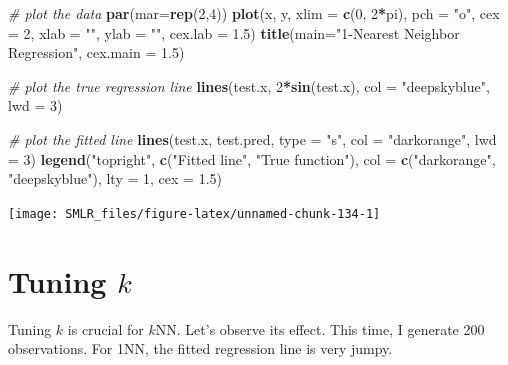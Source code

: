 \documentclass[
]{book}
\newenvironment{Shaded}{\begin{snugshade}}{\end{snugshade}}
\newcommand{\AttributeTok}[1]{\textcolor[rgb]{0.13,0.29,0.53}{#1}}
\newcommand{\CommentTok}[1]{\textcolor[rgb]{0.56,0.35,0.01}{\textit{#1}}}
\newcommand{\DecValTok}[1]{\textcolor[rgb]{0.00,0.00,0.81}{#1}}
\newcommand{\FloatTok}[1]{\textcolor[rgb]{0.00,0.00,0.81}{#1}}
\newcommand{\FunctionTok}[1]{\textcolor[rgb]{0.13,0.29,0.53}{\textbf{#1}}}
\newcommand{\NormalTok}[1]{#1}
\newcommand{\SpecialCharTok}[1]{\textcolor[rgb]{0.81,0.36,0.00}{\textbf{#1}}}
\newcommand{\StringTok}[1]{\textcolor[rgb]{0.31,0.60,0.02}{#1}}
\theoremstyle{definition}
\theoremstyle{definition}
\theoremstyle{definition}
\theoremstyle{definition}
\theoremstyle{remark}
\begin{document}
\begin{Shaded}
\begin{Highlighting}[]
    \CommentTok{\# plot the data}
    \FunctionTok{par}\NormalTok{(}\AttributeTok{mar=}\FunctionTok{rep}\NormalTok{(}\DecValTok{2}\NormalTok{,}\DecValTok{4}\NormalTok{))}
    \FunctionTok{plot}\NormalTok{(x, y, }\AttributeTok{xlim =} \FunctionTok{c}\NormalTok{(}\DecValTok{0}\NormalTok{, }\DecValTok{2}\SpecialCharTok{*}\NormalTok{pi), }\AttributeTok{pch =} \StringTok{"o"}\NormalTok{, }\AttributeTok{cex =} \DecValTok{2}\NormalTok{, }
         \AttributeTok{xlab =} \StringTok{""}\NormalTok{, }\AttributeTok{ylab =} \StringTok{""}\NormalTok{, }\AttributeTok{cex.lab =} \FloatTok{1.5}\NormalTok{)}
    \FunctionTok{title}\NormalTok{(}\AttributeTok{main=}\StringTok{"1{-}Nearest Neighbor Regression"}\NormalTok{, }\AttributeTok{cex.main =} \FloatTok{1.5}\NormalTok{)}
    
    \CommentTok{\# plot the true regression line}
    \FunctionTok{lines}\NormalTok{(test.x, }\DecValTok{2}\SpecialCharTok{*}\FunctionTok{sin}\NormalTok{(test.x), }\AttributeTok{col =} \StringTok{"deepskyblue"}\NormalTok{, }\AttributeTok{lwd =} \DecValTok{3}\NormalTok{)}
    
    \CommentTok{\# plot the fitted line}
    \FunctionTok{lines}\NormalTok{(test.x, test.pred, }\AttributeTok{type =} \StringTok{"s"}\NormalTok{, }\AttributeTok{col =} \StringTok{"darkorange"}\NormalTok{, }\AttributeTok{lwd =} \DecValTok{3}\NormalTok{)}
    \FunctionTok{legend}\NormalTok{(}\StringTok{"topright"}\NormalTok{, }\FunctionTok{c}\NormalTok{(}\StringTok{"Fitted line"}\NormalTok{, }\StringTok{"True function"}\NormalTok{), }
           \AttributeTok{col =} \FunctionTok{c}\NormalTok{(}\StringTok{"darkorange"}\NormalTok{, }\StringTok{"deepskyblue"}\NormalTok{), }\AttributeTok{lty =} \DecValTok{1}\NormalTok{, }\AttributeTok{cex =} \FloatTok{1.5}\NormalTok{)}
\end{Highlighting}
\end{Shaded}

\begin{center}\texttt{[image: SMLR\_files/figure-latex/unnamed-chunk-134-1]} \end{center}

\hypertarget{tuning-k}{%
\section{\texorpdfstring{Tuning \(k\)}{Tuning k}}\label{tuning-k}}

Tuning \(k\) is crucial for \(k\)NN. Let's observe its effect. This time, I generate 200 observations. For 1NN, the fitted regression line is very jumpy.
\end{document}
